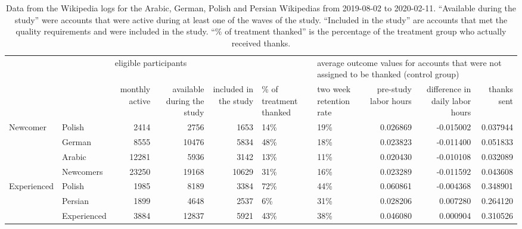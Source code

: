 \begin{table}
\centering
\caption{Data from the Wikipedia logs for the Arabic, German, Polish and Persian Wikipedias from 2019-08-02 to 2020-02-11. “Available during the study” were accounts that were active during at least one of the waves of the study. “Included in the study” are accounts that met the quality requirements and were included in the study. “\% of treatment thanked” is the percentage of the treatment group who actually received thanks.}
\label{summary}
\begin{tabular}{llrrrllrrr}
\toprule
            &             & \multicolumn{4}{l}{eligible participants} & \multicolumn{4}{l}{average outcome values for accounts that were not assigned to be thanked (control group)} \\
            &             &        monthly active & available during the study & included in the study & \% of treatment thanked &                                                                  two week retention rate & pre-study labor hours & difference in daily labor hours & thanks sent \\
\midrule
\multirow{4}{*}{Newcomer} & Polish &                  2414 &                       2756 &                  1653 &                    14\% &                                                19\% &              0.026869 &                       -0.015002 &    0.037944 \\
            & German &                  8555 &                      10476 &                  5834 &                    48\% &                                                18\% &              0.023823 &                       -0.011400 &    0.051833 \\
            & Arabic &                 12281 &                       5936 &                  3142 &                    13\% &                                                11\% &              0.020430 &                       -0.010108 &    0.032089 \\
            & Newcomers &                 23250 &                      19168 &                 10629 &                    31\% &                                                16\% &              0.023289 &                       -0.011592 &    0.043608 \\
\cline{1-10}
\multirow{3}{*}{Experienced} & Polish &                  1985 &                       8189 &                  3384 &                    72\% &                                                44\% &              0.060861 &                       -0.004368 &    0.348901 \\
            & Persian &                  1899 &                       4648 &                  2537 &                     6\% &                                                31\% &              0.028206 &                        0.007280 &    0.264120 \\
            & Experienced &                  3884 &                      12837 &                  5921 &                    43\% &                                                38\% &              0.046080 &                        0.000904 &    0.310526 \\
\bottomrule
\end{tabular}
\end{table}
